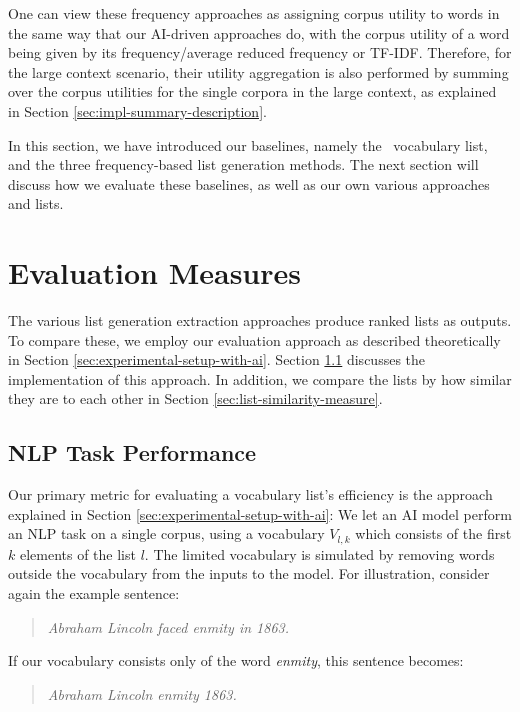One can view these frequency approaches as assigning corpus utility to words in the same way that our AI-driven approaches do, with the corpus utility of a word being given by its frequency/average reduced frequency or TF-IDF.
Therefore, for the large context scenario, their utility aggregation is also performed by summing over the corpus utilities for the single corpora in the large context, as explained in Section \ref{sec:impl-summary-description}.

In this section, we have introduced our baselines, namely the \Rosetta\ vocabulary list, and the three frequency-based list generation methods.
The next section will discuss how we evaluate these baselines, as well as our own various approaches and lists.

\section{Evaluation Measures}\label{sec:evaluation-measures}
The various list generation extraction approaches produce ranked lists as outputs.
To compare these, we employ our evaluation approach as described theoretically in Section \ref{sec:experimental-setup-with-ai}.
Section \ref{sec:task-performance-measure} discusses the implementation of this approach.
In addition, we compare the lists by how similar they are to each other in Section \ref{sec:list-similarity-measure}.

\subsection{NLP Task Performance} \label{sec:task-performance-measure}
Our primary metric for evaluating a vocabulary list's efficiency is the approach explained in Section \ref{sec:experimental-setup-with-ai}:
We let an AI model perform an NLP task on a single corpus, using a vocabulary $V_{l, k}$ which consists of the first $k$ elements of the list $l$.
The limited vocabulary is simulated by removing words outside the vocabulary from the inputs to the model.
For illustration, consider again the example sentence:

\begin{quote}
	\textit{Abraham Lincoln faced enmity in 1863.}
\end{quote}

If our vocabulary consists only of the word \textit{enmity}, this sentence becomes:

\begin{quote}
	\textit{Abraham Lincoln enmity 1863.}
\end{quote}

